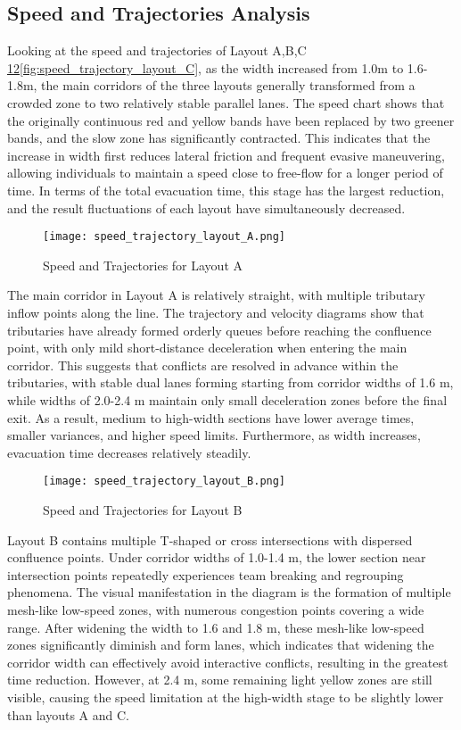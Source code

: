\subsection{Speed and Trajectories Analysis}
Looking at the speed and trajectories of Layout A,B,C \ref{fig:speed_trajectory_layout_A}\ref{fig:speed_trajectory_layout_B}\ref{fig:speed_trajectory_layout_C}, as the width increased from 1.0m to 1.6-1.8m, the main corridors of the three layouts generally transformed from a crowded zone to two relatively stable parallel lanes. The speed chart shows that the originally continuous red and yellow bands have been replaced by two greener bands, and the slow zone has significantly contracted. This indicates that the increase in width first reduces lateral friction and frequent evasive maneuvering, allowing individuals to maintain a speed close to free-flow for a longer period of time. In terms of the total evacuation time, this stage has the largest reduction, and the result fluctuations of each layout have simultaneously decreased.
\begin{figure}[h]
    \centering
    \texttt{[image: speed\_trajectory\_layout\_A.png]}
    \caption{Speed and Trajectories for Layout A}
    \label{fig:speed_trajectory_layout_A}
\end{figure}
The main corridor in Layout A is relatively straight, with multiple tributary inflow points along the line. The trajectory and velocity diagrams show that tributaries have already formed orderly queues before reaching the confluence point, with only mild short-distance deceleration when entering the main corridor. This suggests that conflicts are resolved in advance within the tributaries, with stable dual lanes forming starting from corridor widths of 1.6 m, while widths of 2.0-2.4 m maintain only small deceleration zones before the final exit. As a result, medium to high-width sections have lower average times, smaller variances, and higher speed limits. Furthermore, as width increases, evacuation time decreases relatively steadily.
\begin{figure}[h]
    \centering
    \texttt{[image: speed\_trajectory\_layout\_B.png]}
    \caption{Speed and Trajectories for Layout B}
    \label{fig:speed_trajectory_layout_B}
\end{figure}
Layout B contains multiple T-shaped or cross intersections with dispersed confluence points. Under corridor widths of 1.0-1.4 m, the lower section near intersection points repeatedly experiences team breaking and regrouping phenomena. The visual manifestation in the diagram is the formation of multiple mesh-like low-speed zones, with numerous congestion points covering a wide range. After widening the width to 1.6 and 1.8 m, these mesh-like low-speed zones significantly diminish and form lanes, which indicates that widening the corridor width can effectively avoid interactive conflicts, resulting in the greatest time reduction. However, at 2.4 m, some remaining light yellow zones are still visible, causing the speed limitation at the high-width stage to be slightly lower than layouts A and C.

